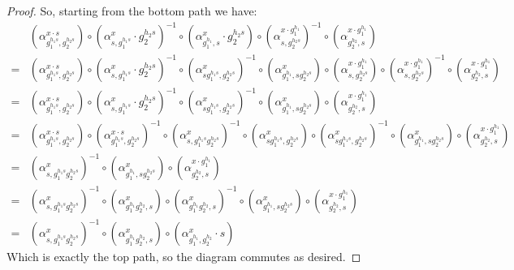 \documentclass[12pt, final]{amsart}
\theoremstyle{remark}
\theoremstyle{definition}
\theoremstyle{plain}
\begin{document}
\begin{proof}
    So, starting from the bottom path we have:
    \begin{align*}
         &(\alpha_{g_{1}^{h_{1}s},g_{2}^{h_{2}s}}^{x\cdot s}) \circ (\alpha_{s,g_{1}^{h_{1}s}}^{x}\cdot g_{2}^{h_{2}s})^{-1}\circ (\alpha_{g_{1}^{h_{1}},s}^{x} \cdot g_{2}^{h_{2}s})\circ (\alpha_{s,g_{2}^{h_{2}s}}^{x\cdot g_{1}^{h_{1}}})^{-1}\circ(\alpha_{g_{2}^{h_{2}},s}^{x\cdot g_{1}^{h_{1}}}) \\
        =&(\alpha_{g_{1}^{h_{1}s},g_{2}^{h_{2}s}}^{x\cdot s}) \circ (\alpha_{s,g_{1}^{h_{1}s}}^{x}\cdot g_{2}^{h_{2}s})^{-1}\circ (\alpha_{sg_{1}^{h_{1}s},g_{2}^{h_{2}s}}^{x})^{-1}\circ (\alpha_{g_{1}^{h_{1}},sg_{2}^{h_{2}s}}^{x})\circ (\alpha_{s,g_{2}^{h_{2}s}}^{x\cdot g_{1}^{h_{1}}})\circ (\alpha_{s,g_{2}^{h_{2}s}}^{x\cdot g_{1}^{h_{1}}})^{-1}\circ(\alpha_{g_{2}^{h_{2}},s}^{x\cdot g_{1}^{h_{1}}}) \\
        =&(\alpha_{g_{1}^{h_{1}s},g_{2}^{h_{2}s}}^{x\cdot s}) \circ (\alpha_{s,g_{1}^{h_{1}s}}^{x}\cdot g_{2}^{h_{2}s})^{-1}\circ (\alpha_{sg_{1}^{h_{1}s},g_{2}^{h_{2}s}}^{x})^{-1}\circ (\alpha_{g_{1}^{h_{1}},sg_{2}^{h_{2}s}}^{x})\circ(\alpha_{g_{2}^{h_{2}},s}^{x\cdot g_{1}^{h_{1}}}) \\
        =&(\alpha_{g_{1}^{h_{1}s},g_{2}^{h_{2}s}}^{x\cdot s}) \circ (\alpha_{g_{1}^{h_{1}s},g_{2}^{h_{2}s}}^{x\cdot s})^{-1}\circ (\alpha_{s,g_{1}^{h_{1}s}g_{2}^{h_{2}s}}^{x})^{-1}\circ(\alpha_{sg_{1}^{h_{1}s},g_{2}^{h_{2}s}}^{x})\circ (\alpha_{sg_{1}^{h_{1}s},g_{2}^{h_{2}s}}^{x})^{-1}\circ (\alpha_{g_{1}^{h_{1}},sg_{2}^{h_{2}s}}^{x})\circ(\alpha_{g_{2}^{h_{2}},s}^{x\cdot g_{1}^{h_{1}}}) \\
        =&(\alpha_{s,g_{1}^{h_{1}s}g_{2}^{h_{2}s}}^{x})^{-1} \circ (\alpha_{g_{1}^{h_{1}},sg_{2}^{h_{2}s}}^{x}) \circ(\alpha_{g_{2}^{h_{2}},s}^{x\cdot g_{1}^{h_{1}}}) \\
        =&(\alpha_{s,g_{1}^{h_{1}s}g_{2}^{h_{2}s}}^{x})^{-1} \circ (\alpha_{g_{1}^{h_{1}}g_{2}^{h_{2}},s}^{x}) \circ (\alpha_{g_{1}^{h_{1}}g_{2}^{h_{2}},s}^{x})^{-1} \circ (\alpha_{g_{1}^{h_{1}},sg_{2}^{h_{2}s}}^{x})\circ(\alpha_{g_{2}^{h_{2}},s}^{x\cdot g_{1}^{h_{1}}}) \\
        =&(\alpha_{s,g_{1}^{h_{1}s}g_{2}^{h_{2}s}}^{x})^{-1} \circ (\alpha_{g_{1}^{h_{1}}g_{2}^{h_{2}},s}^{x}) \circ (\alpha_{g_{1}^{h_{1}},g_{2}^{h_{2}}}^{x}\cdot s)
    \end{align*}
    Which is exactly the top path, so the diagram commutes as desired.
    \fi


\end{proof}
\end{document}
